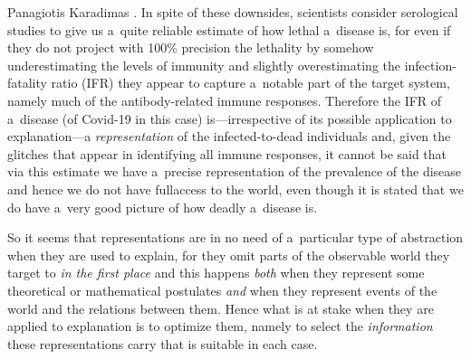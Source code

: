 \begin{artengenv}{Panagiotis Karadimas}
\parencite[][]{burgess_are_2020}. %
 In spite of these downsides, scientists consider serological studies to give us a~quite reliable estimate of how lethal a~disease is, for even if they do not project with 100\% precision the lethality by somehow underestimating the levels of immunity and slightly overestimating the infection-fatality ratio (IFR) they appear to capture a~notable part of the target system, namely much of the antibody-related immune responses. Therefore the IFR of a~disease (of Covid-19 in this case) is---irrespective of its possible application to explanation---a \textit{representation} of the infected-to-dead individuals and, given the glitches that appear in identifying all immune responses, it cannot be said that via this estimate we have a~precise representation of the prevalence of the disease and hence we do not have fullaccess to the world, even though it is stated that we do have a~very good picture of how deadly a~disease is.

So it seems that representations are in no need of a~particular type of abstraction when they are used to explain, for they omit parts of the observable world they target to \textit{in the first place} and this happens \textit{both} when they represent some theoretical or mathematical postulates \textit{and} when they represent events of the world and the relations between them. Hence what is at stake when they are applied to explanation is to optimize them, namely to select the \textit{information} these representations carry that is suitable in each case.


\end{artengenv}
